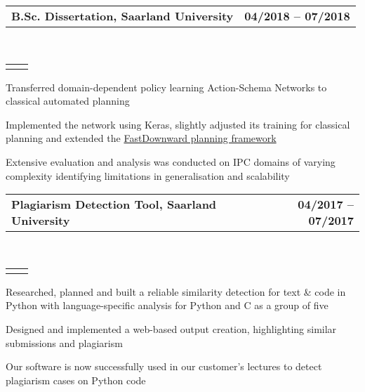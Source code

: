\documentclass[]{lukas-cv}
\makeatletter
\newcommand{\headerrow}[2]
{\begin{tabular*}{\linewidth}{l@{\extracolsep{\fill}}r}
	\fontspec{Helvetica}\fontsize{12pt}{12pt}\selectfont\bfseries{\color{subheadings}#1} &
	\fontspec{Helvetica}\fontsize{12pt}{12pt}\selectfont\bfseries{\color{subheadings}#2} \\
\end{tabular*}}
\newcommand{\locationrow}[2]
{\begin{tabular*}{\linewidth}{l@{\extracolsep{\fill}}r}
        \color{headings}\scshape\fontspec{Heiti TC Medium}\fontsize{10pt}{12pt}\selectfont{#1}  &
        \color{headings}\scshape\fontspec{Heiti TC Medium}\fontsize{10pt}{12pt}\selectfont{#2}  \\
\end{tabular*}}
\makeatother
\begin{document}

\noindent
\headerrow{B.Sc. Dissertation, Saarland University}{04/2018 -- 07/2018}
\\
\locationrow{Foundations of Artificial Intelligence (FAI) Group}{}
\begin{tightitemize}{1.7em}
    \item Transferred domain-dependent policy learning Action-Schema Networks to
    classical automated planning
    \item Implemented the network using Keras, slightly adjusted its training for classical planning and extended 
    the \href{http://www.fast-downward.org}{FastDownward planning framework}
    \item Extensive evaluation and analysis was conducted on IPC domains of varying complexity identifying
    limitations in generalisation and scalability
\end{tightitemize}
\largesectionsep

\noindent
\headerrow{Plagiarism Detection Tool, Saarland University}{04/2017 -- 07/2017}
\\
\locationrow{Group Project for Software Engineering Lecture}{}
\begin{tightitemize}{1.7em}
    \item Researched, planned and built a reliable similarity detection for text \& code in Python with language-specific analysis for Python and C as a group of five
    \item Designed and implemented a web-based output creation, highlighting similar submissions and plagiarism
    \item Our software is now successfully used in our customer's lectures to detect plagiarism cases on Python code
\end{tightitemize}
\largesectionsep
\end{document}
